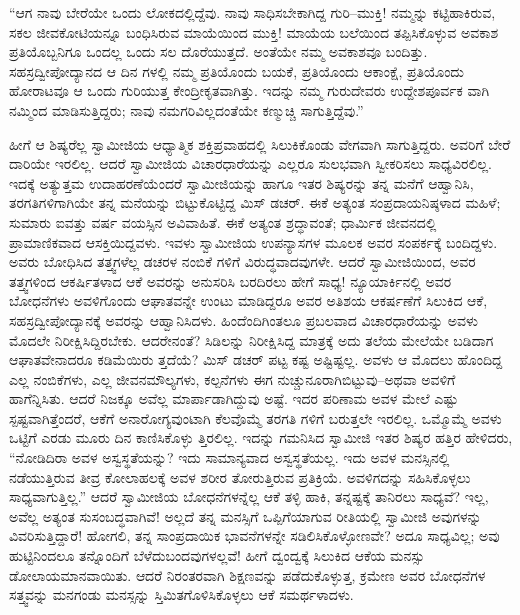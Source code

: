 “ಆಗ ನಾವು ಬೇರೆಯೇ ಒಂದು ಲೋಕದಲ್ಲಿದ್ದೆವು. ನಾವು ಸಾಧಿಸಬೇಕಾಗಿದ್ದ ಗುರಿ–ಮುಕ್ತಿ! ನಮ್ಮನ್ನು ಕಟ್ಟಿಹಾಕಿರುವ, ಸಕಲ ಜೀವಕೋಟಿಯನ್ನೂ ಬಂಧಿಸಿರುವ ಮಾಯೆಯಿಂದ ಮುಕ್ತಿ! ಮಾಯೆಯ ಬಲೆಯಿಂದ ತಪ್ಪಿಸಿಕೊಳ್ಳುವ ಅವಕಾಶ ಪ್ರತಿಯೊಬ್ಬನಿಗೂ ಒಂದಲ್ಲ ಒಂದು ಸಲ ದೊರೆಯುತ್ತದೆ. ಅಂತೆಯೇ ನಮ್ಮ ಅವಕಾಶವೂ ಬಂದಿತ್ತು. ಸಹಸ್ರದ್ವೀಪೋದ್ಯಾನದ ಆ ದಿನ ಗಳಲ್ಲಿ ನಮ್ಮ ಪ್ರತಿಯೊಂದು ಬಯಕೆ, ಪ್ರತಿಯೊಂದು ಆಕಾಂಕ್ಷೆ, ಪ್ರತಿಯೊಂದು ಹೋರಾಟವೂ ಆ ಒಂದು ಗುರಿಯುತ್ತ ಕೇಂದ್ರೀಕೃತವಾಗಿತ್ತು. ಇದನ್ನು ನಮ್ಮ ಗುರುದೇವರು ಉದ್ದೇಶಪೂರ್ವಕ ವಾಗಿ ನಮ್ಮಿಂದ ಮಾಡಿಸುತ್ತಿದ್ದರು; ನಾವು ನಮಗರಿವಿಲ್ಲದಂತೆಯೇ ಕಣ್ಮುಚ್ಚಿ ಸಾಗುತ್ತಿದ್ದೆವು.”

ಹೀಗೆ ಆ ಶಿಷ್ಯರೆಲ್ಲ ಸ್ವಾಮೀಜಿಯ ಆಧ್ಯಾತ್ಮಿಕ ಶಕ್ತಿಪ್ರವಾಹದಲ್ಲಿ ಸಿಲುಕಿಕೊಂಡು ವೇಗವಾಗಿ ಸಾಗುತ್ತಿದ್ದರು. ಅವರಿಗೆ ಬೇರೆ ದಾರಿಯೇ ಇರಲಿಲ್ಲ. ಆದರೆ ಸ್ವಾಮೀಜಿಯ ವಿಚಾರಧಾರೆಯನ್ನು ಎಲ್ಲರೂ ಸುಲಭವಾಗಿ ಸ್ವೀಕರಿಸಲು ಸಾಧ್ಯವಿರಲಿಲ್ಲ. ಇದಕ್ಕೆ ಅತ್ಯುತ್ತಮ ಉದಾಹರಣೆಯೆಂದರೆ ಸ್ವಾಮೀಜಿಯನ್ನು ಹಾಗೂ ಇತರ ಶಿಷ್ಯರನ್ನು ತನ್ನ ಮನೆಗೆ ಆಹ್ವಾನಿಸಿ, ತರಗತಿಗಳಿಗಾಗಿಯೇ ತನ್ನ ಮನೆಯನ್ನು ಬಿಟ್ಟುಕೊಟ್ಟಿದ್ದ ಮಿಸ್ ಡಚರ್. ಈಕೆ ಅತ್ಯಂತ ಸಂಪ್ರದಾಯನಿಷ್ಠಳಾದ ಮಹಿಳೆ; ಸುಮಾರು ಐವತ್ತು ವರ್ಷ ವಯಸ್ಸಿನ ಅವಿವಾಹಿತೆ. ಈಕೆ ಅತ್ಯಂತ ಶ್ರದ್ಧಾವಂತೆ; ಧಾರ್ಮಿಕ ಜೀವನದಲ್ಲಿ ಪ್ರಾಮಾಣಿಕವಾದ ಆಸಕ್ತಿಯಿದ್ದವಳು. ಇವಳು ಸ್ವಾಮೀಜಿಯ ಉಪನ್ಯಾಸಗಳ ಮೂಲಕ ಅವರ ಸಂಪರ್ಕಕ್ಕೆ ಬಂದಿದ್ದಳು. ಅವರು ಬೋಧಿಸಿದ ತತ್ತ್ವಗಳೆಲ್ಲ ಡಚರಳ ನಂಬಿಕೆ ಗಳಿಗೆ ವಿರುದ್ಧವಾದವುಗಳೇ. ಆದರೆ ಸ್ವಾಮೀಜಿಯಿಂದ, ಅವರ ತತ್ತ್ವಗಳಿಂದ ಆಕರ್ಷಿತಳಾದ ಆಕೆ ಅವರನ್ನು ಅನುಸರಿಸಿ ಬರದಿರಲು ಹೇಗೆ ಸಾಧ್ಯ! ನ್ಯೂಯಾರ್ಕಿನಲ್ಲಿ ಅವರ ಬೋಧನೆಗಳು ಅವಳಿಗೊಂದು ಆಘಾತವನ್ನೇ ಉಂಟು ಮಾಡಿದ್ದರೂ ಅವರ ಅತಿಶಯ ಆಕರ್ಷಣೆಗೆ ಸಿಲುಕಿದ ಆಕೆ, ಸಹಸ್ರದ್ವೀಪೋದ್ಯಾನಕ್ಕೆ ಅವರನ್ನು ಆಹ್ವಾನಿಸಿದಳು. ಹಿಂದೆಂದಿಗಿಂತಲೂ ಪ್ರಬಲವಾದ ವಿಚಾರಧಾರೆಯನ್ನು ಅವಳು ಮೊದಲೇ ನಿರೀಕ್ಷಿಸಿದ್ದಿರಬೇಕು. ಆದರೇನಂತೆ? ಸಿಡಿಲನ್ನು ನಿರೀಕ್ಷಿಸಿದ್ದ ಮಾತ್ರಕ್ಕೆ ಅದು ತಲೆಯ ಮೇಲೆಯೇ ಬಡಿದಾಗ ಆಘಾತವೇನಾದರೂ ಕಡಿಮೆಯಿರು ತ್ತದೆಯೆ? ಮಿಸ್ ಡಚರ್ ಪಟ್ಟ ಕಷ್ಟ ಅಷ್ಟಿಷ್ಟಲ್ಲ. ಅವಳು ಆ ಮೊದಲು ಹೊಂದಿದ್ದ ಎಲ್ಲ ನಂಬಿಕೆಗಳು, ಎಲ್ಲ ಜೀವನಮೌಲ್ಯಗಳು, ಕಲ್ಪನೆಗಳು ಈಗ ನುಚ್ಚುನೂರಾಗಿಬಿಟ್ಟುವು–ಅಥವಾ ಅವಳಿಗೆ ಹಾಗೆನ್ನಿಸಿತು. ಆದರೆ ನಿಜಕ್ಕೂ ಅವೆಲ್ಲ ಮಾರ್ಪಾಡಾಗಿದ್ದುವು ಅಷ್ಟೆ. ಇದರ ಪರಿಣಾಮ ಅವಳ ಮೇಲೆ ಎಷ್ಟು ಸ್ಪಷ್ಟವಾಗಿತ್ತೆಂದರೆ, ಆಕೆಗೆ ಅನಾರೋಗ್ಯವುಂಟಾಗಿ ಕೆಲವೊಮ್ಮೆ ತರಗತಿ ಗಳಿಗೆ ಬರುತ್ತಲೇ ಇರಲಿಲ್ಲ. ಒಮ್ಮೊಮ್ಮೆ ಅವಳು ಒಟ್ಟಿಗೆ ಎರಡು ಮೂರು ದಿನ ಕಾಣಿಸಿಕೊಳ್ಳು ತ್ತಿರಲಿಲ್ಲ. ಇದನ್ನು ಗಮನಿಸಿದ ಸ್ವಾಮೀಜಿ ಇತರ ಶಿಷ್ಯರ ಹತ್ತಿರ ಹೇಳಿದರು, “ನೋಡಿದಿರಾ ಅವಳ ಅಸ್ವಸ್ಥತೆಯನ್ನು? ಇದು ಸಾಮಾನ್ಯವಾದ ಅಸ್ವಸ್ಥತೆಯಲ್ಲ. ಇದು ಅವಳ ಮನಸ್ಸಿನಲ್ಲಿ ನಡೆಯುತ್ತಿರುವ ತೀವ್ರ ಕೋಲಾಹಲಕ್ಕೆ ಅವಳ ಶರೀರ ತೋರುತ್ತಿರುವ ಪ್ರತಿಕ್ರಿಯೆ. ಅವಳಿಗದನ್ನು ಸಹಿಸಿಕೊಳ್ಳಲು ಸಾಧ್ಯವಾಗುತ್ತಿಲ್ಲ.” ಆದರೆ ಸ್ವಾಮೀಜಿಯ ಬೋಧನೆಗಳನ್ನೆಲ್ಲ ಆಕೆ ತಳ್ಳಿ ಹಾಕಿ, ತನ್ನಷ್ಟಕ್ಕೆ ತಾನಿರಲು ಸಾಧ್ಯವೆ? ಇಲ್ಲ, ಅವೆಲ್ಲ ಅತ್ಯಂತ ಸುಸಂಬದ್ಧವಾಗಿವೆ! ಅಲ್ಲದೆ ತನ್ನ ಮನಸ್ಸಿಗೆ ಒಪ್ಪಿಗೆಯಾಗುವ ರೀತಿಯಲ್ಲಿ ಸ್ವಾಮೀಜಿ ಅವುಗಳನ್ನು ವಿವರಿಸುತ್ತಿದ್ದಾರೆ! ಹೋಗಲಿ, ತನ್ನ ಸಾಂಪ್ರದಾಯಿಕ ಭಾವನೆಗಳನ್ನೇ ಸಡಿಲಿಸಿಕೊಳ್ಳೋಣವೇ? ಅದೂ ಸಾಧ್ಯವಿಲ್ಲ; ಅವು ಹುಟ್ಟಿನಿಂದಲೂ ತನ್ನೊಂದಿಗೆ ಬೆಳೆದುಬಂದವುಗಳಲ್ಲವೆ! ಹೀಗೆ ದ್ವಂದ್ವಕ್ಕೆ ಸಿಲುಕಿದ ಆಕೆಯ ಮನಸ್ಸು ಡೋಲಾಯಮಾನವಾಯಿತು. ಆದರೆ ನಿರಂತರವಾಗಿ ಶಿಕ್ಷಣವನ್ನು ಪಡೆದುಕೊಳ್ಳುತ್ತ, ಕ್ರಮೇಣ ಅವರ ಬೋಧನೆಗಳ ಸತ್ತ್ವವನ್ನು ಮನಗಂಡು ಮನಸ್ಸನ್ನು ಸ್ತಿಮಿತಗೊಳಿಸಿಕೊಳ್ಳಲು ಆಕೆ ಸಮರ್ಥಳಾದಳು.

